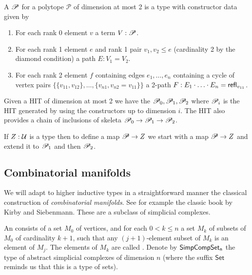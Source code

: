 \begin{mydef}
A  \( \P \) for a polytope \( \mathcal{P} \) of dimension at most 2 is a type with constructor data given by
\begin{enumerate}
\item For each rank 0 element \( v \) a term \( V:\P \).
\item For each rank 1 element \( e \) and rank 1 pair \( v_1,v_2\leq e \) (cardinality 2 by the diamond condition) a path \( E:V_1=V_2 \).
\item For each rank 2 element \( f \) containing edges \( e_1,\ldots,e_n \) containing a cycle of vertex pairs \( \{\{v_{11},v_{12}\},\ldots,\{v_{n1},v_{n2}=v_{11}\}\} \) a 2-path \( F:E_1\cdot\ldots\cdot E_n=\refl_{v_{11}} \).
\end{enumerate}
\end{mydef}

\begin{mydef}
Given a HIT of dimension at most 2 we have the  \( \P_0,\P_1,\P_2 \) where \( \P_i \) is the HIT generated by using the constructors up to dimension \( i \). The HIT also provides a chain of inclusions of skeleta \( \P_0\to\P_1\to\P_2 \).
\end{mydef}

If \( Z:\uni \) is a type then to define a map \( \P\to Z \) we start with a map \( \P\to Z \) and extend it to \( \P_1 \) and then \( \P_2 \). 

\subsection{Combinatorial manifolds}

We will adapt to higher inductive types in a straightforward manner the classical construction of \emph{combinatorial manifolds}. See for example the classic book by Kirby and Siebenmann\cite{kirby_siebenmann}. These are a subclass of simplicial complexes.

\begin{mydef}
An  consists of a set \( M_0 \) of vertices, and for each \( 0<k\leq n \) a set \( M_k \) of subsets of \( M_0 \) of cardinality \( k+1 \), such that any \( (j+1) \)-element subset of \( M_k \) is an element of \( M_j \). The elements of \( M_k \) are called . Denote by \( \simcomp \) the type of abstract simplicial complexes of dimension \( n \) (where the suffix \( \mathsf{Set} \) reminds us that this is a type of sets).
\end{mydef}

